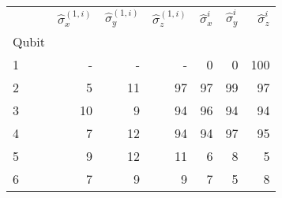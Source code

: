\begin{tabular}{lrrrrrr}
\toprule
{} &  $\hat{\sigma}^{(1, i)}_x$ &  $\hat{\sigma}^{(1, i)}_y$ &  $\hat{\sigma}^{(1, i)}_z$ &  $\hat{\sigma}^{i}_x$ &  $\hat{\sigma}^{i}_y$ &  $\hat{\sigma}^{i}_z$ \\
Qubit &                            &                            &                            &                       &                       &                       \\
\midrule
1     &                          - &                          - &                          - &                     0 &                     0 &                   100 \\
2     &                          5 &                         11 &                         97 &                    97 &                    99 &                    97 \\
3     &                         10 &                          9 &                         94 &                    96 &                    94 &                    94 \\
4     &                          7 &                         12 &                         94 &                    94 &                    97 &                    95 \\
5     &                          9 &                         12 &                         11 &                     6 &                     8 &                     5 \\
6     &                          7 &                          9 &                          9 &                     7 &                     5 &                     8 \\
\bottomrule
\end{tabular}

